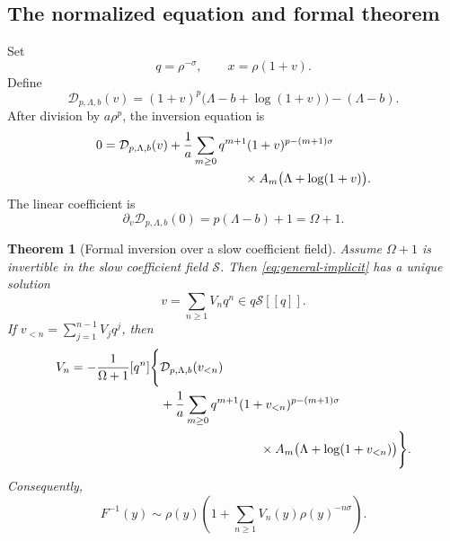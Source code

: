 \documentclass[11pt,a4paper]{article}
\numberwithin{equation}{section}
\newtheorem{theorem}{Theorem}[section]
\theoremstyle{remark}
\newcommand{\coeff}[2]{[{}#1^{#2}]}
\begin{document}
\subsection{The normalized equation and formal theorem}

Set
\begin{equation}
q=\rho^{-\sigma},
\qquad x=\rho(1+v).
\label{eq:general-q-v}
\end{equation}
Define
\begin{equation}
\mathcal D_{p,\Lambda,b}(v)
=(1+v)^p\bigl(\Lambda-b+\log(1+v)\bigr)
-(\Lambda-b).
\label{eq:general-D}
\end{equation}
After division by \(a\rho^p\), the inversion equation is
\begin{align}
0={}&\mathcal D_{p,\Lambda,b}(v)
+\frac1a\sum_{m\ge0}q^{m+1}
(1+v)^{p-(m+1)\sigma}
\notag\\
&\hspace{35mm}\times
A_m\bigl(\Lambda+\log(1+v)\bigr).
\label{eq:general-implicit}
\end{align}
The linear coefficient is
\begin{equation}
\partial_v\mathcal D_{p,\Lambda,b}(0)
=p(\Lambda-b)+1=\Omega+1.
\label{eq:linear-factor}
\end{equation}

\begin{theorem}[Formal inversion over a slow coefficient field]
\label{thm:general-formal-inversion}
Assume \(\Omega+1\) is invertible in the slow coefficient field
\(\mathscr S\).  Then \cref{eq:general-implicit} has a unique solution
\begin{equation}
v=\sum_{n\ge1}V_n q^n\in q\mathscr S[[q]].
\label{eq:general-v-series}
\end{equation}
If \(v_{<n}=\sum_{j=1}^{n-1}V_jq^j\), then
\begin{align}
V_n=-\frac1{\Omega+1}\coeff{q}{n}\Bigg\{
&\mathcal D_{p,\Lambda,b}(v_{<n})
\notag\\
&+\frac1a\sum_{m\ge0}q^{m+1}
(1+v_{<n})^{p-(m+1)\sigma}
\notag\\
&\hspace{28mm}\times
A_m\bigl(\Lambda+\log(1+v_{<n})\bigr)
\Bigg\}.
\label{eq:general-V-recurrence}
\end{align}
Consequently,
\begin{equation}
F^{-1}(y)\sim
\rho(y)\left(1+\sum_{n\ge1}V_n(y)\rho(y)^{-n\sigma}\right).
\label{eq:general-inverse}
\end{equation}
\end{theorem}
\end{document}
